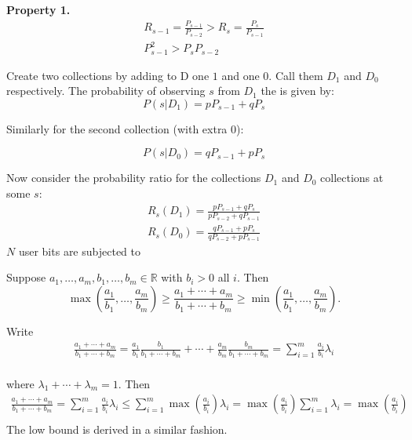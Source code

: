 \documentclass[11pt]{article}
\newcommand{\R}{\mathbb{R}}
\begin{document}
\textbf{Property 1.}
\begin{align}
R_{s-1} = \frac{P_{s-1}}{P_{s-2}} > R_s  = \frac{P_{s}}{P_{s-1}} \\
P^2_{s-1} > P_sP_{s-2} 
\end{align}

Create two collections by adding to D one $1$ and one $0$.  Call them $D_1$ and $D_0$ respectively. The probability of observing $s$ from $D_1$ the is given by:
\[ P(s | D_1) = pP_{s-1} + qP_s \]

Similarly for the second collection (with extra 0):

\[ P(s | D_0) = qP_{s-1} + pP_s \]

Now consider the probability ratio for the collections $D_1$ and $D_0$ collections at some $s$:
\begin{align}
R_s(D_1) = \frac{ pP_{s-1} + qP_s }{pP_{s-2} + qP_{s-1}} \\
R_s(D_0) = \frac{ qP_{s-1} + pP_s }{qP_{s-2} + pP_{s-1}}
\end{align}
 $N$ user bits are subjected to  


\begin{lem} \label{lem:rsbound}
Suppose $a_1,\dots,a_m,b_1,\dots,b_m \in \R$ with $b_i > 0$ all $i$.
Then 
\[ \max\left(\frac{a_1}{b_1},\dots,\frac{a_m}{b_m}\right) \geq  \frac{a_1 + \cdots + a_m}{b_1 + \cdots + b_m} \geq \min \left(\frac{a_1}{b_1},\dots,\frac{a_m}{b_m}\right). \]
\end{lem}
\begin{pf}
Write
 \begin{align*}
  \frac{a_1 + \cdots + a_m}{b_1 + \cdots + b_m}
= \frac{a_1}{b_1}\frac{b_1}{b_1+\cdots+b_m} +
\cdots + \frac{a_m}{b_m}\frac{b_m}{b_1+\cdots+b_m} = \sum_{i=1}^m \frac{a_i}{b_i} \lambda_i  \\ 
\end{align*}

where $\lambda_1 + \cdots + \lambda_m = 1$.  Then
 \begin{align*}
  \frac{a_1 + \cdots + a_m}{b_1 + \cdots + b_m} = \sum_{i=1}^m \frac{a_i}{b_i} \lambda_i  \leq  \sum_{i=1}^m \max \left ( \frac{a_i}{b_i} \right ) \lambda_i  = \max \left ( \frac{a_i}{b_i} \right ) \sum_{i=1}^m \lambda_i = \max \left ( \frac{a_i}{b_i} \right ) \\ 
\end{align*}
The low bound is derived in a similar fashion. 
\end{pf}
\end{document}

